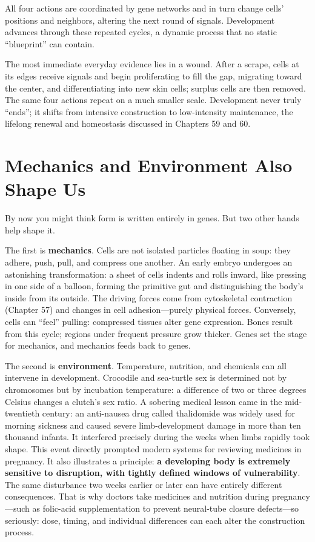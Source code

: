 All four actions are coordinated by gene networks and in turn change cells' positions and neighbors, altering the next round of signals. Development advances through these repeated cycles, a dynamic process that no static ``blueprint'' can contain.

The most immediate everyday evidence lies in a wound. After a scrape, cells at its edges receive signals and begin proliferating to fill the gap, migrating toward the center, and differentiating into new skin cells; surplus cells are then removed. The same four actions repeat on a much smaller scale. Development never truly ``ends''; it shifts from intensive construction to low-intensity maintenance, the lifelong renewal and homeostasis discussed in Chapters 59 and 60.

\section{Mechanics and Environment Also Shape Us}

By now you might think form is written entirely in genes. But two other hands help shape it.

The first is \textbf{mechanics}. Cells are not isolated particles floating in soup: they adhere, push, pull, and compress one another. An early embryo undergoes an astonishing transformation: a sheet of cells indents and rolls inward, like pressing in one side of a balloon, forming the primitive gut and distinguishing the body's inside from its outside. The driving forces come from cytoskeletal contraction (Chapter 57) and changes in cell adhesion---purely physical forces. Conversely, cells can ``feel'' pulling: compressed tissues alter gene expression. Bones result from this cycle; regions under frequent pressure grow thicker. Genes set the stage for mechanics, and mechanics feeds back to genes.

The second is \textbf{environment}. Temperature, nutrition, and chemicals can all intervene in development. Crocodile and sea-turtle sex is determined not by chromosomes but by incubation temperature: a difference of two or three degrees Celsius changes a clutch's sex ratio. A sobering medical lesson came in the mid-twentieth century: an anti-nausea drug called thalidomide was widely used for morning sickness and caused severe limb-development damage in more than ten thousand infants. It interfered precisely during the weeks when limbs rapidly took shape. This event directly prompted modern systems for reviewing medicines in pregnancy. It also illustrates a principle: \textbf{a developing body is extremely sensitive to disruption, with tightly defined windows of vulnerability}. The same disturbance two weeks earlier or later can have entirely different consequences. That is why doctors take medicines and nutrition during pregnancy---such as folic-acid supplementation to prevent neural-tube closure defects---so seriously: dose, timing, and individual differences can each alter the construction process.

